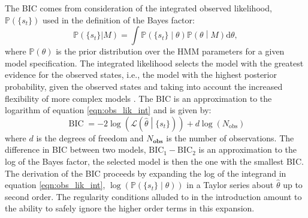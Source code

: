 The BIC comes from consideration of the integrated observed likelihood, $\mathbb{P}\left(\{s_t\}\right)$ used in the definition of the Bayes factor: 
\begin{equation}\label{eqn:obs_lik_int}
       \mathbb{P}\left(\{s_t\}|M\right) = \int \mathbb{P}\left(\{s_t\}\middle|\theta \right)\mathbb{P}\left(\theta \middle | M\right) \mathrm{d}\theta,
\end{equation}
where $\mathbb{P}(\theta)$ is the prior distribution over the HMM parameters for a given model specification. The integrated likelihood selects the model with the greatest evidence for the observed states, i.e., the model with the highest posterior probability, given the observed states and taking into account the increased flexibility of more complex models \cite{mackay2003information}\cite{kassBayesFactors1995}. The BIC is an approximation to the logarithm of equation \ref{eqn:obs_lik_int} and is given by\cite{schwarzEstimatingDimensionModel1978a}:
\begin{equation}\label{eqn:bic}
    \operatorname{BIC} = -2\log{\left(\mathcal{L}\left(\hat{\theta}\middle| \{s_t\}\right)\right)} + d\log{\left(N_{\mathrm{obs}}\right)}
\end{equation}
where $d$ is the degrees of freedom and $N_{\mathbf{obs}}$ is the number of observations.  The difference in BIC between two models, $\mathrm{BIC}_{1}-\mathrm{BIC}_{2}$ is an approximation to the log of the Bayes factor, the selected model is then the one with the smallest BIC.  The derivation of the BIC proceeds by expanding the log of the integrand in equation \ref{eqn:obs_lik_int},  $\log{\left(\mathbb{P}\left(\{s_{t}\}\middle |\theta \right)\right)}$ in a Taylor series about $\hat{\theta}$ up to second order. The regularity conditions alluded to in the introduction amount to the ability to safely ignore the higher order terms in this expansion\cite{mclachlanFiniteMixtureModels2000}.

